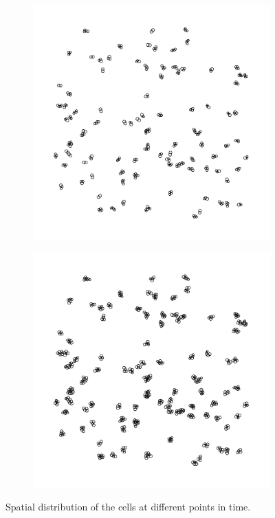 \documentclass{article}
\begin{document}
\begin{figure}
\begin{subfigure}{0.49\textwidth}
    \end{subfigure}
    \begin{subfigure}{0.49\textwidth}
        \centering
        \includegraphics[width=\linewidth]{../Results/Figures/CellClusters_T=48.pdf}
    \end{subfigure}
    \begin{subfigure}{0.49\textwidth}
        \centering
        \includegraphics[width=\linewidth]{../Results/Figures/CellClusters_T=72.pdf}
    \end{subfigure}
    \caption{Spatial distribution of the cells at different points in time.}
    \label{fig:cell_distribution}
\end{figure}
\end{document}
